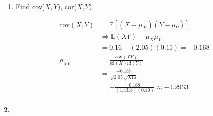 \begin{enumerate}[label=(\alph*)]
        \item Find cov($X,Y$), cor($X,Y$).
        \\
        \begin{mdframed}
            \begin{align*}
                \text{cov}(X,Y) & = \mathbb{E}[(X-\mu_{X})(Y-\mu_{Y})]                      \\
                                & \Rightarrow \mathbb{E}(XY)-\mu_{X}\mu_{Y}                 \\
                                & = 0.16 - (2.05)(0.16) = \boxed{-0.168}                    \\
                \rho_{XY}       & = \frac{\text{cov}(XY)}{\text{sd}(X)\text{sd}(Y)}         \\
                                & = \frac{-0.168}{\sqrt{2.05}\sqrt{0.16}}           \\
                                & = -\frac{0.168}{(1.4318)(0.40)} \approx \boxed{-0.2933}
            \end{align*}
        \end{mdframed}
    \end{enumerate}

    \pagebreak

    \paragraph*{2.}


